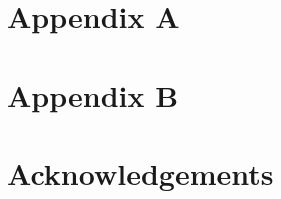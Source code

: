 \documentclass{Configuration_Files/PoliMi3i_thesis}
\begin{document}
\mainmatter %



















%




\cleardoublepage
{} %
\appendix
\chapter{Appendix A}


\chapter{Appendix B}


\listoffigures

\listoftables



\chapter*{Acknowledgements}


\cleardoublepage
\end{document}
